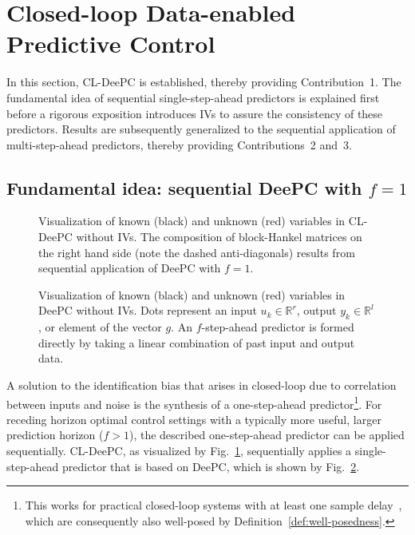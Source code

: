 \section{Closed-loop Data-enabled Predictive Control}\label{sec:CL-DeePC}
\noindent In this section, \ac{CL-DeePC} is established, thereby providing Contribution~1. The fundamental idea of sequential single-step-ahead predictors is explained first before a rigorous exposition introduces \ac{IVs} to assure the consistency of these predictors. Results are subsequently generalized to the sequential application of multi-step-ahead predictors, thereby providing Contributions~2 and~3.

\subsection{Fundamental idea: sequential \ac{DeePC} with $f=1$}
\begin{figure}[b!]
\centering

\caption{Visualization of known (black) and unknown (red) variables in \ac{CL-DeePC} without \ac{IVs}. The composition of block-Hankel matrices on the right hand side (note the dashed anti-diagonals) results from sequential application of \ac{DeePC} with $f=1$.}
\label{fig:CL-DeePC}
\end{figure}
\begin{figure}[b!]
\centering

\caption{Visualization of known (black) and unknown (red) variables in \ac{DeePC} without \ac{IVs}. Dots represent an input $u_k\in\mathbb{R}^r$, output $y_k\in\mathbb{R}^l$, or element of the vector $g$. An $f$-step-ahead predictor is formed directly by taking a linear combination of past input and output data.}
\label{fig:regular-DeePC}
\end{figure}
\noindent A solution to the identification bias that arises in closed-loop due to correlation between inputs and noise %
is the synthesis of a one-step-ahead predictor\footnote{This works for practical closed-loop systems with at least one sample delay~\citep{Ljung1996}, which are consequently also well-posed by Definition~\ref{def:well-posedness}.}. For receding horizon optimal control settings with a typically more useful, larger prediction horizon ($f>1$), the described one-step-ahead predictor can be applied sequentially. \ac{CL-DeePC}, as visualized by Fig.~\ref{fig:CL-DeePC}, sequentially applies a single-step-ahead predictor that is based on \ac{DeePC}, which is shown by Fig.~\ref{fig:regular-DeePC}.

